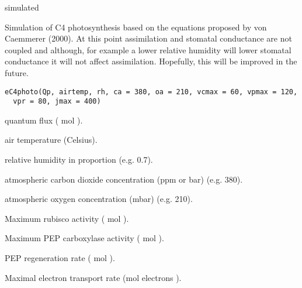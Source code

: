 \documentclass[letterpaper]{book}
\begin{document}
%
\begin{Source}\relax
simulated
\end{Source}
%
\begin{Description}\relax
Simulation of C4 photosynthesis based on the equations
proposed by von Caemmerer (2000).  At this point
assimilation and stomatal conductance are not coupled and
although, for example a lower relative humidity will lower
stomatal conductance it will not affect assimilation.
Hopefully, this will be improved in the future.
\end{Description}
%
\begin{Usage}
\begin{verbatim}
eC4photo(Qp, airtemp, rh, ca = 380, oa = 210, vcmax = 60, vpmax = 120,
  vpr = 80, jmax = 400)
\end{verbatim}
\end{Usage}
%
\begin{Arguments}
\begin{ldescription}
\item[\code{Qp}] quantum flux (\eqn{\mu}{} mol
 ).

\item[\code{airtemp}] air temperature (Celsius).

\item[\code{rh}] relative humidity in proportion (e.g. 0.7).

\item[\code{ca}] atmospheric carbon dioxide concentration (ppm
or \eqn{\mu}{}bar) (e.g. 380).

\item[\code{oa}] atmospheric oxygen concentration (mbar) (e.g.
210).

\item[\code{vcmax}] Maximum rubisco activity (\eqn{\mu}{}
mol  ).

\item[\code{vpmax}] Maximum PEP carboxylase activity
(\eqn{\mu}{} mol 
).

\item[\code{vpr}] PEP regeneration rate (\eqn{\mu}{} mol
 ).

\item[\code{jmax}] Maximal electron transport rate
(\eqn{\mu}{}mol electrons 
).
\end{ldescription}
\end{Arguments}
\end{document}
